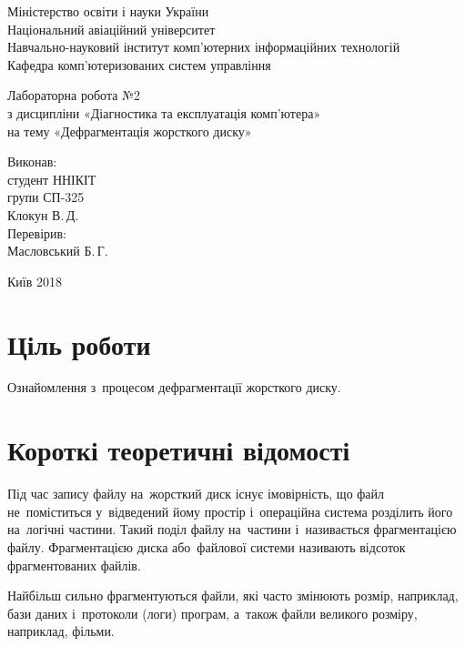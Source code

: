 \documentclass[
	a4paper,
	oneside,
	DIV = 12,
	fontsize = 13pt,
	headings = normal,
]{scrartcl}
\newcommand{\allcaps}[1]{{\addfontfeatures{LetterSpace = 5}#1}}
\begin{document}
	\begin{titlepage}
		\begin{center}
			Міністерство освіти і науки України\\
			Національний авіаційний університет\\
			Навчально-науковий інститут комп'ютерних інформаційних технологій\\
			Кафедра комп'ютеризованих систем управління

			\vspace{\fill}
				Лабораторна робота №2\\
				з дисципліни «Діагностика та експлуатація комп'ютера»\\
				на тему «Дефрагментація жорсткого диску»\\

			\vspace{\fill}

			\begin{flushright}
				Виконав:\\
				студент \allcaps{ННІКІТ}\\
				групи СП-325\\
				Клокун В.\,Д.\\
				Перевірив:\\
				Масловський Б.\,Г.
			\end{flushright}

			Київ 2018
		\end{center}
	\end{titlepage}

	\section{Ціль роботи}
		Ознайомлення з~процесом дефрагментації жорсткого диску.

	\section{Короткі теоретичні відомості}
		Під час запису файлу на~жорсткий диск існує імовірність, що файл не~поміститься у~відведений йому простір і~операційна система розділить його на~логічні частини. Такий поділ файлу на~частини і~називається фрагментацією файлу. Фрагментацією диска або~файлової системи називають відсоток фрагментованих файлів.

		Найбільш сильно фрагментуються файли, які часто змінюють розмір, наприклад, бази даних і~протоколи (логи) програм, а~також файли великого розміру, наприклад, фільми.
\end{document}

